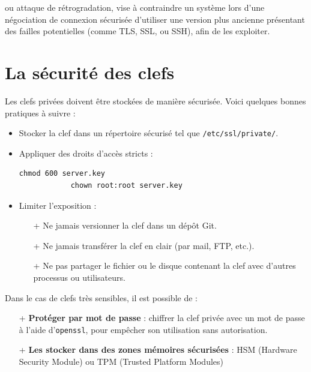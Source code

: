 \documentclass[french, 12pt]{article}%
\newcommand{\itemE}{\item[$\bullet$]}
\newcommand{\titreencadre}{Titre}
\newenvironment{encadre}[1]{\renewcommand{\titreencadre}{#1}
	\begin{mdframed}[style=encadrestyle]
	\vspace{0.5\baselineskip}
	}{%
	\end{mdframed}}
\begin{document}
\begin{encadre}{downgrade attack.}
ou attaque de rétrogradation, vise à contraindre un système  lors d'une négociation de connexion sécurisée d'utiliser une version plus ancienne présentant des failles potentielles (comme TLS, SSL, ou SSH), afin de les exploiter.
\end{encadre}




\section{La sécurité des clefs}

Les clefs privées doivent être stockées de manière sécurisée. Voici quelques bonnes pratiques à suivre :

\begin{itemize}
\itemE Stocker la clef dans un répertoire sécurisé tel que \verb?/etc/ssl/private/?.
\itemE Appliquer des droits d'accès stricts :
        \begin{lstlisting}[style=commande]
			chmod 600 server.key
			chown root:root server.key
        \end{lstlisting}
\itemE  Limiter l'exposition :
        \begin{itemize}
            \item[+] Ne jamais versionner la clef dans un dépôt Git.
            \item[+] Ne jamais transférer la clef en clair (par mail, FTP, etc.).
            \item[+] Ne pas partager le fichier ou le disque contenant la clef avec d’autres processus ou utilisateurs.
        \end{itemize}
\end{itemize}

Dans le cas de clefs très sensibles, il est possible de : 
    \begin{itemize}
         \item[+] \textbf{Protéger par mot de passe} : chiffrer la clef privée avec un mot de passe à l’aide d’\texttt{openssl}, pour empêcher son utilisation sans autorisation.
        \item[+] \textbf{Les stocker dans des zones mémoires sécurisées } : HSM (Hardware Security Module) 	ou TPM (Trusted Platform Modules)
	\end{itemize}
\end{document}
